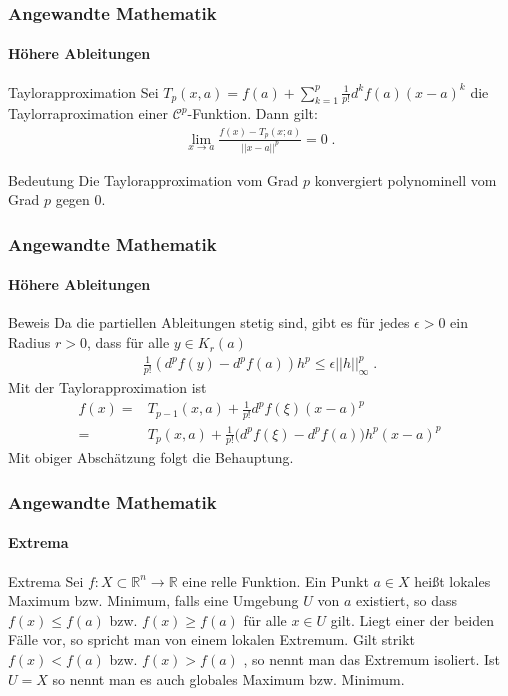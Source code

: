 \documentclass{beamer}
\begin{document}
\begin{frame}
    \frametitle{Angewandte Mathematik}
\framesubtitle{Höhere Ableitungen}
    \begin{block}{Taylorapproximation}
Sei $T_p(x,a) =  f(a) + \sum_{k=1}^{p}\frac{1}{p!} d^k f(a) (x-a)^k$ die Taylorraproximation einer $\mathcal{C}^{p}$-Funktion. Dann gilt: 
\begin{align*}
\lim_{x \to a} \frac{f(x) - T_p(x;a)}{  || x-a  ||^p} = 0 \;. 
\end{align*}
\end{block}

    \begin{block}{Bedeutung}
Die Taylorapproximation vom Grad $p$ konvergiert polynominell vom Grad $p$ gegen $0$.
\end{block}
 \end{frame}

\begin{frame}
    \frametitle{Angewandte Mathematik}
\framesubtitle{Höhere Ableitungen}
    \begin{block}{Beweis}
Da die partiellen Ableitungen stetig sind, gibt es für jedes $\epsilon > 0$ ein Radius $r >0$, dass für alle $y \in K_r(a)$
\begin{align*}
\frac{1}{p!} (d^pf(y) -d^pf(a))h^p \leq \epsilon ||h||_{\infty}^p \; . 
\end{align*}
Mit der Taylorapproximation ist 
\begin{align*}
f(x) = & T_{p-1}(x, a) +  \frac{1}{p!} d^{p}f(\xi) (x-a)^{p} \\
 = & T_p(x,a) +   \frac{1}{p!} \bigl( d^pf(\xi) -d^pf(a) \bigr) h^p (x-a)^p
\end{align*} 
Mit obiger Abschätzung folgt die Behauptung.
\end{block}
 \end{frame}


\begin{frame}
    \frametitle{Angewandte Mathematik}
\framesubtitle{Extrema}
    \begin{block}{Extrema}
Sei $f : X \subset \mathbb{R}^n \to \mathbb{R}$ eine relle Funktion.  Ein Punkt $a \in  X$ heißt lokales Maximum bzw. Minimum, falls eine Umgebung $U$ von $a$ existiert, so dass $f(x) \leq f(a)$ bzw.  $f(x) \geq f(a)$ für alle $x \in U$ gilt. Liegt einer der beiden Fälle vor, so spricht man von einem lokalen Extremum. Gilt strikt $f(x) <  f(a)$ bzw.  $f(x) > f(a)$ , so nennt man das Extremum isoliert. Ist $U = X$ so nennt man es auch globales Maximum bzw. Minimum.
\end{block}
 \end{frame}
\end{document}
